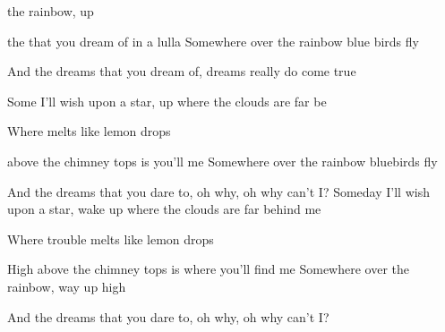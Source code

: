 

\zs

  the rainbow,  up 

 the  that you dream of  in a lulla  
\ks
\zs
Somewhere over the rainbow blue birds fly

And the dreams that you dream of, dreams really do come true
\ks
\zr

Some I'll wish upon a star,
 up where the clouds are far be 

Where melts like lemon drops

 above the chimney tops is  you'll  me
\kr
\zs
Somewhere over the rainbow bluebirds fly

And the dreams that you dare to, oh why, oh why can't I?
\ks
\zr
Someday I'll wish upon a star, wake up where the clouds are far behind me

Where trouble melts like lemon drops

High above the chimney tops is where you'll find me
\kr
\zs
Somewhere over the rainbow, way up high

And the dreams that you dare to, oh why, oh why can't I?
\ks

\kp



